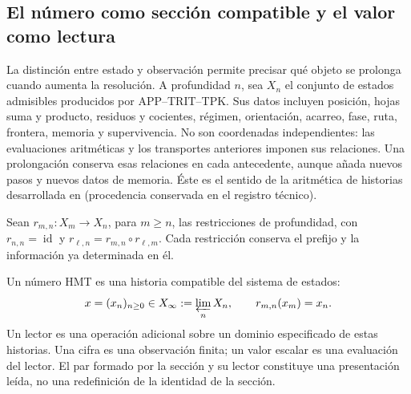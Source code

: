 
\subsection{El número como sección compatible y el valor como lectura}
\label{hist:seccion}

La distinción entre estado y observación permite precisar qué objeto se
prolonga cuando aumenta la resolución. A profundidad \(n\), sea \(X_n\)
el conjunto de estados admisibles producidos por APP--TRIT--TPK. Sus datos
incluyen posición, hojas suma y producto, residuos y cocientes, régimen,
orientación, acarreo, fase, ruta, frontera, memoria y supervivencia. No son
coordenadas independientes: las evaluaciones aritméticas y los transportes
anteriores imponen sus relaciones. Una prolongación conserva esas relaciones
en cada antecedente, aunque añada nuevos pasos y nuevos datos de memoria.
Éste es el sentido de la aritmética de historias desarrollada en
\textup{(procedencia conservada en el registro técnico)}.

Sean \(r_{m,n}:X_m\to X_n\), para \(m\geq n\), las restricciones de
profundidad, con \(r_{n,n}=\operatorname{id}\) y
\(r_{\ell,n}=r_{m,n}\circ r_{\ell,m}\). Cada restricción conserva el
prefijo y la información ya determinada en él.

\begin{definition}
Un número HMT es una historia compatible del sistema de estados:
\begin{equation}
 x=(x_n)_{n\geq0}\in X_\infty:=\varprojlim_n X_n,
 \qquad r_{m,n}(x_m)=x_n.
 \label{hist:limite-inverso}
\end{equation}
Un lector es una operación adicional sobre un dominio especificado de estas
historias. Una cifra es una observación finita; un valor escalar es una
evaluación del lector. El par formado por la sección y su lector constituye
una presentación leída, no una redefinición de la identidad de la sección.
\end{definition}

